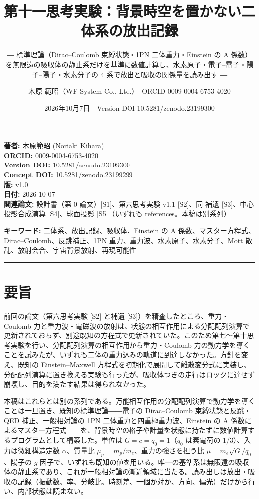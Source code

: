 \documentclass[
  a4paper,
]{ltjsarticle}
\title{第十一思考実験：背景時空を置かない二体系の放出記録}
\subtitle{― 標準理論（Dirac--Coulomb 束縛状態・1PN 二体重力・Einstein の
A
係数）を無限遠の吸収体の静止系だけを基準に数値計算し、水素原子・電子--電子・陽子--陽子・水素分子の
4 系で放出と吸収の関係量を読み出す ―}
\author{木原 範昭（WF System Co., Ltd.）　ORCID 0009-0004-6753-4020}
\date{2026年10月7日　Version DOI 10.5281/zenodo.23199300}
\begin{document}
\maketitle

\textbf{著者:} 木原範昭 (Noriaki Kihara)\\
\textbf{ORCID:} 0009-0004-6753-4020\\
\textbf{Version DOI:} 10.5281/zenodo.23199300\\
\textbf{Concept DOI:} 10.5281/zenodo.23199299\\
\textbf{版:} v1.0\\
\textbf{日付:} 2026-10-07\\
\textbf{関連論文:} 設計書（第 0 論文）{[}S1{]}、第六思考実験 v1.1
{[}S2{]}、同 補遺 {[}S3{]}、中心投影合成演算 {[}S4{]}、球面投影
{[}S5{]}（いずれも references。本稿は別系列）

\textbf{キーワード:} 二体系、放出記録、吸収体、Einstein の A
係数、マスター方程式、Dirac--Coulomb、反跳補正、1PN
重力、重力波、水素原子、水素分子、Mott
散乱、放射会合、宇宙背景放射、再現可能性

\begin{center}\rule{0.5\linewidth}{0.5pt}\end{center}

\section{要旨}\label{ux8981ux65e8}

前回の論文（第六思考実験 {[}S2{]} と補遺
{[}S3{]}）を精査したところ、重力・Coulomb
力と重力波・電磁波の放射は、状態の相互作用による分配配列演算で更新されておらず、別途既知の方程式で更新されていた。このため第七〜第十思考実験を行い、分配配列演算の相互作用から重力・Coulomb
力の動力学を導くことを試みたが、いずれも二体の重力込みの軌道に到達しなかった。方針を変え、既知の
Einstein--Maxwell
方程式を初期化で展開して離散変分式に実装し、分配配列演算に置き換える実験も行ったが、吸収体つきの走行はロックに達せず崩壊し、目的を満たす結果は得られなかった。

本稿はこれらとは別の系列である。万能相互作用の分配配列演算で動力学を導くことは一旦置き、既知の標準理論――電子の
Dirac--Coulomb 束縛状態と反跳・QED 補正、一般相対論の 1PN
二体重力と四重極重力波、Einstein の A
係数によるマスター方程式――を、背景時空の格子や計量を状態に持たずに数値計算するプログラムとして構築した。単位は
\(G=c=q_0=1\)（\(q_0\) は素電荷の 1/3）、入力は微細構造定数
\(\alpha\)、質量比 \(\mu_p=m_p/m_e\)、重力の強さを担う比
\(\mu=m_e\sqrt{G}/q_0\)、陽子の \(g\)
因子で、いずれも既知の値を用いる。唯一の基準系は無限遠の吸収体の静止系であり、これが一般相対論の漸近領域に当たる。読み出しは放出・吸収の記録（振動数、率、分岐比、時刻差、一個か対か、方向、偏光）だけから行い、内部状態は読まない。
\end{document}
